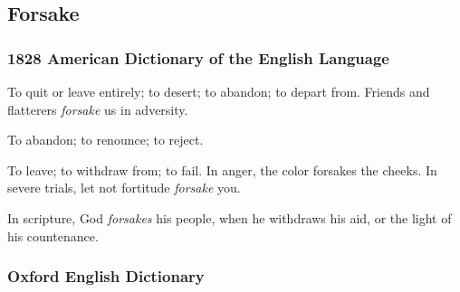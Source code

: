 \begin{compactdesc}
						
						
				\end{compactdesc}

	\subsection{Forsake} %
		\label{FORSAKE}
		
		\subsubsection{1828 American Dictionary of the English Language}
		
			\begin{compactitem}
				\item[1] To quit or leave entirely; to desert; to abandon; to depart from. Friends and flatterers \textit{forsake} us in adversity.
				\item[2] To abandon; to renounce; to reject.
				\item[3] To leave; to withdraw from; to fail. In anger, the color forsakes the cheeks. In severe trials, let not fortitude \textit{forsake} you.
				\item[4] In scripture, God \textit{forsakes} his people, when he withdraws his aid, or the light of his countenance.
			\end{compactitem} 
			
		\subsubsection{Oxford English Dictionary}
		
